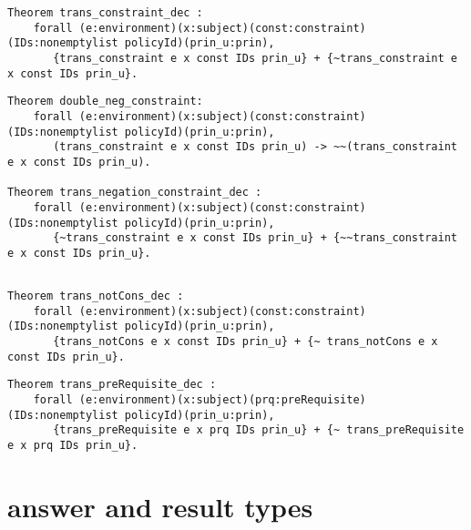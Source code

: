 \begin{lstlisting}
Theorem trans_constraint_dec :
    forall (e:environment)(x:subject)(const:constraint)(IDs:nonemptylist policyId)(prin_u:prin),
       {trans_constraint e x const IDs prin_u} + {~trans_constraint e x const IDs prin_u}.
\end{lstlisting}

\begin{lstlisting}
Theorem double_neg_constraint:
    forall (e:environment)(x:subject)(const:constraint)(IDs:nonemptylist policyId)(prin_u:prin),
       (trans_constraint e x const IDs prin_u) -> ~~(trans_constraint e x const IDs prin_u).
  
Theorem trans_negation_constraint_dec :
    forall (e:environment)(x:subject)(const:constraint)(IDs:nonemptylist policyId)(prin_u:prin),
       {~trans_constraint e x const IDs prin_u} + {~~trans_constraint e x const IDs prin_u}.
       
\end{lstlisting}

\begin{lstlisting}
Theorem trans_notCons_dec :
    forall (e:environment)(x:subject)(const:constraint)(IDs:nonemptylist policyId)(prin_u:prin),
       {trans_notCons e x const IDs prin_u} + {~ trans_notCons e x const IDs prin_u}.

\end{lstlisting}


\begin{lstlisting}
Theorem trans_preRequisite_dec :
    forall (e:environment)(x:subject)(prq:preRequisite)(IDs:nonemptylist policyId)(prin_u:prin),
       {trans_preRequisite e x prq IDs prin_u} + {~ trans_preRequisite e x prq IDs prin_u}.
\end{lstlisting}


\section{answer and result types}\label{sec:answerandresulttypes}


